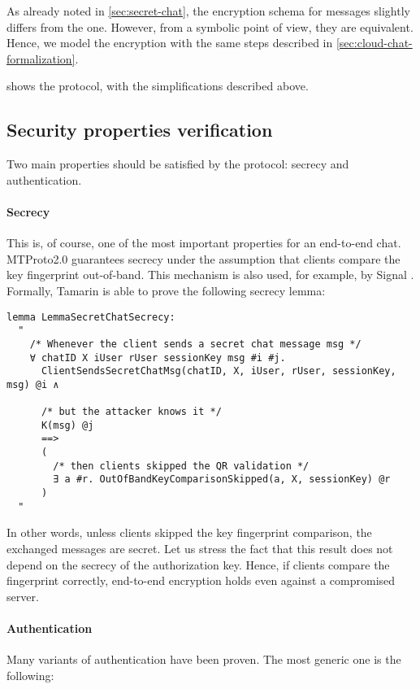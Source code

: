 As already noted in \cref{sec:secret-chat}, the encryption schema for \schat{} messages slightly differs from the \cchat{} one. However, from a symbolic point of view, they are equivalent. Hence, we model the \schat{} encryption with the same steps described in \cref{sec:cloud-chat-formalization}.

 shows the \schat{} protocol, with the simplifications described above.

\subsection{Security properties verification}

Two main properties should be satisfied by the \schat{} protocol: secrecy and authentication.


\paragraph{Secrecy} This is, of course, one of the most important properties for an end-to-end chat. MTProto2.0 guarantees secrecy under the assumption that clients compare the \schat{} key fingerprint out-of-band. This mechanism is also used, for example, by Signal \cite{SignalProtocol}. Formally, Tamarin is able to prove the following secrecy lemma:

\begin{lstlisting}
lemma LemmaSecretChatSecrecy:
  "
    /* Whenever the client sends a secret chat message msg */
    ∀ chatID X iUser rUser sessionKey msg #i #j.
      ClientSendsSecretChatMsg(chatID, X, iUser, rUser, sessionKey, msg) @i ∧
      
      /* but the attacker knows it */
      K(msg) @j
      ==>
      (
        /* then clients skipped the QR validation */
        ∃ a #r. OutOfBandKeyComparisonSkipped(a, X, sessionKey) @r
      )
  "
\end{lstlisting}

In other words, unless clients skipped the key fingerprint comparison, the exchanged messages are secret. Let us stress the fact that this result does not depend on the secrecy of the authorization key. Hence, if clients compare the fingerprint correctly, end-to-end encryption holds even against a compromised server.

\newpage
\paragraph{Authentication}
Many variants of authentication have been proven. The most generic one is the following:

